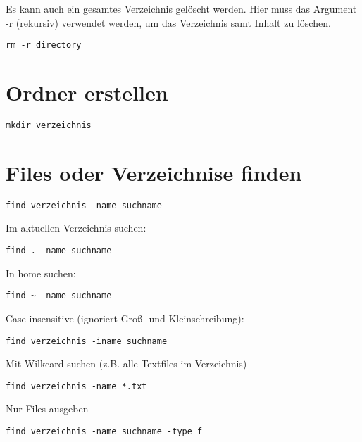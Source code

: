 \documentclass[]{book}
\begin{document}
Es kann auch ein gesamtes Verzeichnis gelöscht werden. Hier muss das Argument -r (rekursiv) verwendet werden, um das Verzeichnis
samt Inhalt zu löschen.

\begin{verbatim}
rm -r directory
\end{verbatim}

\hypertarget{ordner-erstellen}{%
\section{Ordner erstellen}\label{ordner-erstellen}}

\begin{verbatim}
mkdir verzeichnis
\end{verbatim}

\hypertarget{files-oder-verzeichnise-finden}{%
\section{Files oder Verzeichnise finden}\label{files-oder-verzeichnise-finden}}

\begin{verbatim}
find verzeichnis -name suchname
\end{verbatim}

Im aktuellen Verzeichnis suchen:

\begin{verbatim}
find . -name suchname
\end{verbatim}

In home suchen:

\begin{verbatim}
find ~ -name suchname
\end{verbatim}

Case insensitive (ignoriert Groß- und Kleinschreibung):

\begin{verbatim}
find verzeichnis -iname suchname
\end{verbatim}

Mit Wilkcard suchen (z.B. alle Textfiles im Verzeichnis)

\begin{verbatim}
find verzeichnis -name *.txt
\end{verbatim}

Nur Files ausgeben

\begin{verbatim}
find verzeichnis -name suchname -type f
\end{verbatim}
\end{document}
